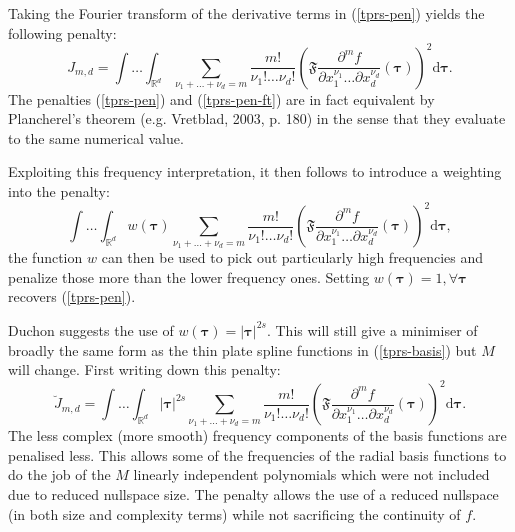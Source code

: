 \documentclass[useAMS,referee]{biom}
\begin{document}
Taking the Fourier transform of the derivative terms in (\ref{tprs-pen}) yields the following penalty:
\begin{equation}
J_{m,d} = \int \ldots \int_{\mathbb{R}^d} \sum_{\nu_1 + \dots + \nu_d=m} \frac{m!}{\nu_1! \dots \nu_d!} \left ( \mathfrak{F} \frac{\partial^m f}{\partial x_1^{\nu_1} \ldots  \partial x_d^{\nu_d}} \left (  \boldsymbol{\tau}\right ) \right )^2 \text{d} \boldsymbol{\tau}.
\label{tprs-pen-ft}
\end{equation}
The penalties (\ref{tprs-pen}) and (\ref{tprs-pen-ft}) are in fact equivalent by Plancherel's theorem (e.g. Vretblad, 2003, p. 180) in the sense that they evaluate to the same numerical value.

Exploiting this frequency interpretation, it then follows to introduce a weighting into the penalty: 
\begin{equation}
\int \ldots \int_{\mathbb{R}^d} w(\boldsymbol{\tau}) \sum_{\nu_1 + \dots + \nu_d=m} \frac{m!}{\nu_1! \dots \nu_d!} \left ( \mathfrak{F} \frac{\partial^m f}{\partial x_1^{\nu_1} \ldots  \partial x_d^{\nu_d}} \left (\boldsymbol{\tau} \right ) \right )^2 \text{d} \boldsymbol{\tau},
\label{duchon-penalty-general}
\end{equation}
the function $w$ can then be used to pick out particularly high frequencies and penalize those more than the lower frequency ones. Setting $w(\boldsymbol{\tau})=1, \forall \boldsymbol{\tau}$ recovers (\ref{tprs-pen}).

Duchon suggests the use of $w(\boldsymbol{\tau})= \lvert \boldsymbol{\tau} \rvert^{2s}$. This will still give a minimiser of broadly the same form as the thin plate spline functions in (\ref{tprs-basis}) but $M$ will change. First writing down this penalty:
\begin{equation}
\breve{J}_{m,d} = \int \ldots \int_{\mathbb{R}^d} \lvert \boldsymbol{\tau} \rvert^{2s} \sum_{\nu_1 + \dots + \nu_d=m} \frac{m!}{\nu_1! \dots \nu_d!}\left ( \mathfrak{F} \frac{\partial^m f}{\partial x_1^{\nu_1} \ldots  \partial x_d^{\nu_d}} \left (\boldsymbol{\tau} \right ) \right )^2 \text{d} \boldsymbol{\tau}.
\label{duchon-penalty}
\end{equation}
The less complex (more smooth) frequency components of the basis functions are penalised less. This allows some of the frequencies of  the radial basis functions to do the job of the $M$ linearly independent polynomials which were not included due to reduced nullspace size. The penalty allows the use of a reduced nullspace (in both size and complexity terms) while not sacrificing the continuity of $f$. 
\end{document}

